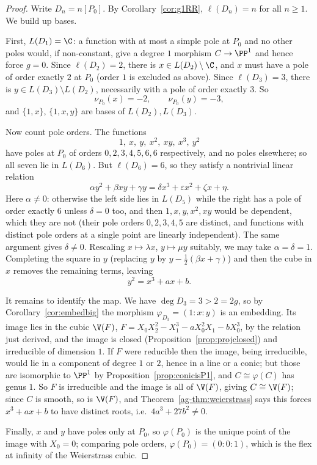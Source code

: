 \begin{proof}
	Write $D_n = n[P_0]$. By Corollary~\ref{cor:g1RR}, $\ell(D_n) = n$ for all $n \geq 1$. We build up bases.

	First, $L(D_1) = \C$: a function with at most a simple pole at $P_0$ and no other poles would, if non-constant, give a degree $1$ morphism $C \to \PP^1$ and hence force $g = 0$. Since $\ell(D_2) = 2$, there is $x \in L(D_2)\setminus\C$, and $x$ must have a pole of order exactly $2$ at $P_0$ (order $1$ is excluded as above). Since $\ell(D_3) = 3$, there is $y \in L(D_3)\setminus L(D_2)$, necessarily with a pole of order exactly $3$. So
	$$\nu_{P_0}(x) = -2, \qquad \nu_{P_0}(y) = -3,$$
	and $\{1,x\}$, $\{1,x,y\}$ are bases of $L(D_2), L(D_3)$.

	Now count pole orders. The functions
	$$1,\ x,\ y,\ x^2,\ xy,\ x^3,\ y^2$$
	have poles at $P_0$ of orders $0,2,3,4,5,6,6$ respectively, and no poles elsewhere; so all seven lie in $L(D_6)$. But $\ell(D_6) = 6$, so they satisfy a nontrivial linear relation
	$$\alpha y^2 + \beta xy + \gamma y = \delta x^3 + \varepsilon x^2 + \zeta x + \eta.$$
	Here $\alpha \neq 0$: otherwise the left side lies in $L(D_5)$ while the right has a pole of order exactly $6$ unless $\delta = 0$ too, and then $1,x,y,x^2,xy$ would be dependent, which they are not (their pole orders $0,2,3,4,5$ are distinct, and functions with distinct pole orders at a single point are linearly independent). The same argument gives $\delta \neq 0$. Rescaling $x \mapsto \lambda x$, $y \mapsto \mu y$ suitably, we may take $\alpha = \delta = 1$. Completing the square in $y$ (replacing $y$ by $y - \tfrac12(\beta x + \gamma)$) and then the cube in $x$ removes the remaining terms, leaving
	$$y^2 = x^3 + ax + b.$$

	It remains to identify the map. We have $\deg D_3 = 3 > 2 = 2g$, so by Corollary~\ref{cor:embedbig} the morphism $\varphi_{D_3} = (1:x:y)$ is an embedding. Its image lies in the cubic $\V(F)$, $F = X_0X_2^2 - X_1^3 - aX_0^2X_1 - bX_0^3$, by the relation just derived, and the image is closed (Proposition~\ref{prop:projclosed}) and irreducible of dimension $1$. If $F$ were reducible then the image, being irreducible, would lie in a component of degree $1$ or $2$, hence in a line or a conic; but those are isomorphic to $\PP^1$ by Proposition~\ref{prop:conicisP1}, and $C \cong \varphi(C)$ has genus $1$. So $F$ is irreducible and the image is all of $\V(F)$, giving $C \cong \V(F)$; since $C$ is smooth, so is $\V(F)$, and Theorem~\ref{ag-thm:weierstrass} says this forces $x^3+ax+b$ to have distinct roots, i.e.\ $4a^3+27b^2 \neq 0$.

	Finally, $x$ and $y$ have poles only at $P_0$, so $\varphi(P_0)$ is the unique point of the image with $X_0 = 0$; comparing pole orders, $\varphi(P_0) = (0:0:1)$, which is the flex at infinity of the Weierstrass cubic.
\end{proof}

